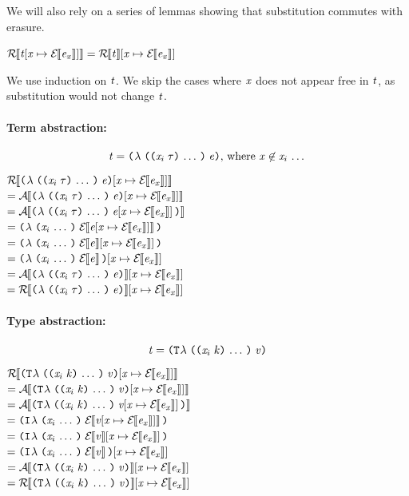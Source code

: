 We will also rely on a series of lemmas showing that substitution commutes with erasure.
\newcommand{\eexprsubst}[1]{\subst{#1}{\var}{\EraseE{\expr_\var}}}
\newcommand{\etrmsubstE}[1]{\eexprsubst{\EraseTrm{#1}}}
\newcommand{\exprsubstE}[1]{\eexprsubst{\EraseE{#1}}}
\newcommand{\eatomsubstE}[1]{\eexprsubst{\EraseA{#1}}}
\begin{lemma}%
  \label{EESubstErase}
  $\EraseTrm{\eexprsubst{\term}} = \etrmsubstE{\term}$
\end{lemma}
\begin{sproof}
We use induction on $\mathit{t}$.
We skip the cases where $\mathit{x}$ does not appear free in $\mathit{t}$,
as substitution would not change $\mathit{t}$.
\paragraph{Term abstraction:}
\[\term = \lam{\sequence{\notevar{\var_i}{\type}}}{\expr}\text{, where } \var \not\in \sequence{\var_i}\]
$\EraseTrm{\eexprsubst{\lam{\sequence{\notevar{\var_i}{\type}}}{\expr}}}$ \\
$= \EraseA{\eexprsubst{\lam{\sequence{\notevar{\var_i}{\type}}}{\expr}}}$ \\
$= \EraseA{\lam{\sequence{\notevar{\var_i}{\type}}}{\eexprsubst{\expr}}}$ \\
$= \lam{\sequence{\var_i}}{\EraseE{\eexprsubst{\expr}}}$ \\
$= \lam{\sequence{\var_i}}{\exprsubstE{\expr}}$ \\
$= \eexprsubst{\lam{\sequence{\var_i}}{\EraseE{\expr}}}$ \\
$= \eatomsubstE{\lam{\sequence{\notevar{\var_i}{\type}}}{\expr}}$ \\
$= \etrmsubstE{\lam{\sequence{\notevar{\var_i}{\type}}}{\expr}}$ \\

\paragraph{Type abstraction:}
\[\term = \tlam{\sequence{\notevar{\var_i}{\kind}}}{\val}\]
$\EraseTrm{\eexprsubst{\tlam{\sequence{\notevar{\var_i}{\kind}}}{\val}}}$ \\
$= \EraseA{\eexprsubst{\tlam{\sequence{\notevar{\var_i}{\kind}}}{\val}}}$ \\
$= \EraseA{\tlam{\sequence{\notevar{\var_i}{\kind}}}{\eexprsubst{\val}}}$ \\
$= \ilam{\sequence{\var_i}}{\EraseE{\eexprsubst{\val}}}$ \\
$= \ilam{\sequence{\var_i}}{\exprsubstE{\val}}$ \\
$= \eexprsubst{\ilam{\sequence{\var_i}}{\EraseE{\val}}}$ \\
$= \eatomsubstE{\tlam{\sequence{\notevar{\var_i}{\kind}}}{\val}}$ \\
$= \etrmsubstE{\tlam{\sequence{\notevar{\var_i}{\kind}}}{\val}}$ \\


\end{sproof}
